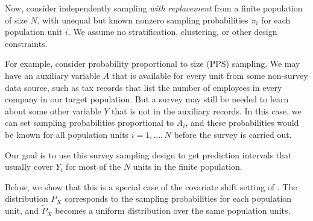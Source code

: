 \documentclass[10.5pt, letterpaper]{article}
\numberwithin{table}{section}
\numberwithin{figure}{section}
\numberwithin{equation}{section}
\begin{document}
Now, consider independently sampling \emph{with replacement} from a finite
population of size $N$, with unequal but known nonzero sampling probabilities $\pi_i$ for each population unit $i$.
We assume no stratification, clustering, or other design constraints.

For example, consider probability proportional to size (PPS) sampling. We may have an auxiliary variable $A$ that is available for every unit from some non-survey data source, such as tax records that list the number of employees in every company in our target population. But a survey may still be needed to learn about some other variable $Y$ that is not in the auxiliary records.
In this case, we can set sampling probabilities proportional to $A_i$, and these probabilities would be known for all population units $i=1,\ldots,N$ before the survey is carried out.

Our goal is to use this survey sampling design to get prediction intervals that usually cover $Y_i$ for most of the $N$ units in the finite population.

Below, we show that this is a special case of the covariate shift setting of \cite{tibshirani2019conformal}. The distribution $P_X$ corresponds to the sampling probabilities for each population unit, and $\tilde{P}_X$ becomes a uniform distribution over the same population units.
\end{document}
